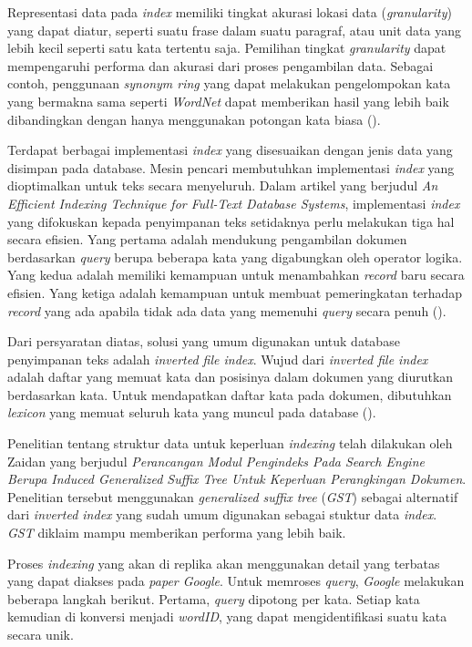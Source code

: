Representasi data pada \emph{index} memiliki tingkat akurasi lokasi data
(\emph{granularity}) yang dapat diatur, seperti suatu frase dalam suatu
paragraf, atau unit data yang lebih kecil seperti satu kata tertentu saja.
Pemilihan tingkat \emph{granularity} dapat mempengaruhi performa dan akurasi
dari proses pengambilan data. Sebagai contoh, penggunaan \emph{synonym ring}
yang dapat melakukan pengelompokan kata yang bermakna sama seperti
\emph{WordNet} dapat memberikan hasil yang lebih baik dibandingkan dengan hanya
menggunakan potongan kata biasa (\cite{gonzalo1998wordnet}).

Terdapat berbagai implementasi \emph{index} yang disesuaikan dengan jenis data
yang disimpan pada database. Mesin pencari membutuhkan implementasi \emph{index}
yang dioptimalkan untuk teks secara menyeluruh. Dalam artikel yang berjudul
\emph{An Efficient Indexing Technique for Full-Text Database Systems}, 
implementasi \emph{index} yang difokuskan kepada penyimpanan teks setidaknya
perlu melakukan tiga hal secara efisien. Yang pertama adalah mendukung
pengambilan dokumen berdasarkan \emph{query} berupa beberapa kata yang
digabungkan oleh operator logika. Yang kedua adalah memiliki kemampuan untuk
menambahkan \emph{record} baru secara efisien. Yang ketiga adalah kemampuan
untuk membuat pemeringkatan terhadap \emph{record} yang ada apabila tidak ada
data yang memenuhi \emph{query} secara penuh (\cite{zobel1992efficient}).

Dari persyaratan diatas, solusi yang umum digunakan untuk database penyimpanan
teks adalah \emph{inverted file index}. Wujud dari \emph{inverted file index}
adalah daftar yang memuat kata dan posisinya dalam dokumen yang diurutkan
berdasarkan kata.  Untuk mendapatkan daftar kata pada dokumen, dibutuhkan
\emph{lexicon} yang memuat seluruh kata yang muncul pada database
(\cite{hersh2001gigabytes}).

Penelitian tentang struktur data untuk keperluan \emph{indexing} telah dilakukan
oleh Zaidan yang berjudul \emph{Perancangan Modul Pengindeks Pada Search Engine
Berupa Induced Generalized Suffix Tree Untuk Keperluan Perangkingan Dokumen}.
Penelitian tersebut menggunakan \emph{generalized suffix tree} (\emph{GST})
sebagai alternatif dari \emph{inverted index} yang sudah umum digunakan sebagai
stuktur data \emph{index}. \emph{GST} diklaim mampu memberikan performa yang
lebih baik.

Proses \emph{indexing} yang akan di replika akan menggunakan detail yang
terbatas yang dapat diakses pada \emph{paper Google}.  Untuk memroses
\emph{query}, \emph{Google} melakukan beberapa langkah berikut.  Pertama,
\emph{query} dipotong per kata. Setiap kata kemudian di konversi menjadi
\emph{wordID}, yang dapat mengidentifikasi suatu kata secara unik.

